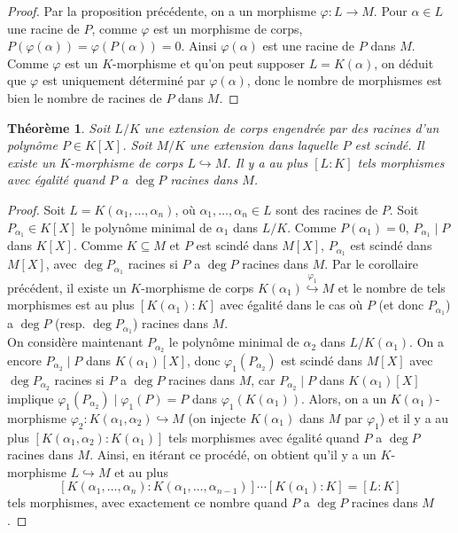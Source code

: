 \documentclass{article}
\theoremstyle{plain}
\newtheorem{theorem}{Théorème}[subsection]
\theoremstyle{definition}
\theoremstyle{remark}
\begin{document}
\begin{proof}
    Par la proposition précédente, on a un morphisme $\varphi : L \to M$. Pour $\alpha \in L$ une racine de $P$, comme $\varphi$ est un morphisme de corps, $P(\varphi(\alpha)) = \varphi(P(\alpha)) = 0$. Ainsi $\varphi(\alpha)$ est une racine de $P$ dans $M$. Comme $\varphi$ est un $K$-morphisme et qu'on peut supposer $L=K(\alpha)$, on déduit que $\varphi$ est uniquement déterminé par $\varphi(\alpha)$, donc le nombre de morphismes est bien le nombre de racines de $P$ dans $M$.
\end{proof}

\begin{theorem} \label{thmmorpolscinde}
    Soit $L/K$ une extension de corps engendrée par des racines d'un polynôme $P \in K[X]$. Soit $M/K$ une extension dans laquelle $P$ est scindé. Il existe un $K$-morphisme de corps $L \hookrightarrow M$. Il y a au plus $[L : K]$ tels morphismes avec égalité quand $P$ a $\deg P$ racines dans $M$.
\end{theorem}

\begin{proof}
    Soit $L=K(\alpha_1,\dots,\alpha_n)$, où $\alpha_1,\dots,\alpha_n \in L$ sont des racines de $P$. Soit $P_{\alpha_1} \in K[X]$ le polynôme minimal de $\alpha_1$ dans $L/K$. Comme $P(\alpha_1) = 0$, $P_{\alpha_1} \mid P$ dans $K[X]$. Comme $K \subseteq M$ et $P$ est scindé dans $M[X]$, $P_{\alpha_1}$ est scindé dans $M[X]$, avec $\deg P_{\alpha_1}$ racines si $P$ a $\deg P$ racines dans $M$. Par le corollaire précédent, il existe un $K$-morphisme de corps $K(\alpha_1) \overset{\varphi_1}{\hookrightarrow} M$ et le nombre de tels morphismes est au plus $[K(\alpha_1) : K]$ avec égalité dans le cas où $P$ (et donc $P_{\alpha_1}$) a $\deg P$ (resp. $\deg P_{\alpha_1}$) racines dans $M$. \\
    On considère maintenant $P_{\alpha_2}$ le polynôme minimal de $\alpha_2$ dans $L/K(\alpha_1)$. On a encore $P_{\alpha_2} \mid P$ dans $K(\alpha_1)[X]$, donc $\varphi_1 (P_{\alpha_2})$ est scindé dans $M[X]$ avec $\deg P_{\alpha_2}$ racines si $P$ a $\deg P$ racines dans $M$, car $P_{\alpha_2} \mid P$ dans $K(\alpha_1)[X]$ implique $\varphi_1(P_{\alpha_2}) \mid \varphi_1(P) = P$ dans $\varphi_1 (K(\alpha_1))$. Alors, on a un $K(\alpha_1)$-morphisme $\varphi_2 : K(\alpha_1, \alpha_2) \hookrightarrow M$ (on injecte $K(\alpha_1)$ dans $M$ par $\varphi_1$) et il y a au plus $[K(\alpha_1, \alpha_2) : K(\alpha_1)]$ tels morphismes avec égalité quand $P$ a $\deg P$ racines dans $M$. Ainsi, en itérant ce procédé, on obtient qu'il y a un $K$-morphisme $L \hookrightarrow M$ et au plus
    \[[K(\alpha_1,\dots,\alpha_n) : K(\alpha_1,\dots,\alpha_{n-1})] \cdots [K(\alpha_1) : K] = [L : K]\]
    tels morphismes, avec exactement ce nombre quand $P$ a $\deg P$ racines dans $M$.
\end{proof}
\end{document}

